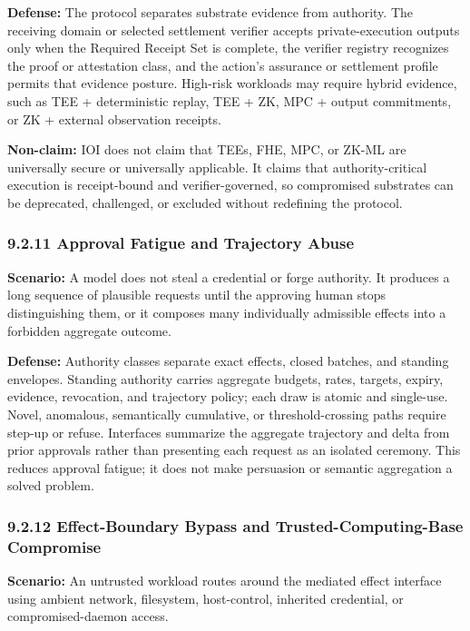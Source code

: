 \documentclass[
  11pt,
]{article}
\begin{document}
\textbf{Defense:} The protocol separates substrate evidence from
authority. The receiving domain or selected settlement verifier accepts
private-execution outputs only when the Required Receipt Set is complete, the
verifier registry recognizes the proof or attestation class, and the action's
assurance or settlement profile permits that
evidence posture. High-risk workloads may require hybrid evidence, such
as TEE + deterministic replay, TEE + ZK, MPC + output commitments, or ZK
+ external observation receipts.

\textbf{Non-claim:} IOI does not claim that TEEs, FHE, MPC, or ZK-ML are
universally secure or universally applicable. It claims that
authority-critical execution is receipt-bound and verifier-governed, so
compromised substrates can be deprecated, challenged, or excluded
without redefining the protocol.

\hypertarget{approval-fatigue-and-trajectory-abuse}{%
\subsubsection{9.2.11 Approval Fatigue and Trajectory
Abuse}\label{approval-fatigue-and-trajectory-abuse}}

\textbf{Scenario:} A model does not steal a credential or forge authority. It
produces a long sequence of plausible requests until the approving human stops
distinguishing them, or it composes many individually admissible effects into a
forbidden aggregate outcome.

\textbf{Defense:} Authority classes separate exact effects, closed batches,
and standing envelopes. Standing authority carries aggregate budgets, rates,
targets, expiry, evidence, revocation, and trajectory policy; each draw is
atomic and single-use. Novel, anomalous, semantically cumulative, or
threshold-crossing paths require step-up or refuse. Interfaces summarize the
aggregate trajectory and delta from prior approvals rather than presenting
each request as an isolated ceremony. This reduces approval fatigue; it does
not make persuasion or semantic aggregation a solved problem.

\hypertarget{effect-boundary-bypass}{%
\subsubsection{9.2.12 Effect-Boundary Bypass and Trusted-Computing-Base
Compromise}\label{effect-boundary-bypass}}

\textbf{Scenario:} An untrusted workload routes around the mediated effect
interface using ambient network, filesystem, host-control, inherited
credential, or compromised-daemon access.
\end{document}

